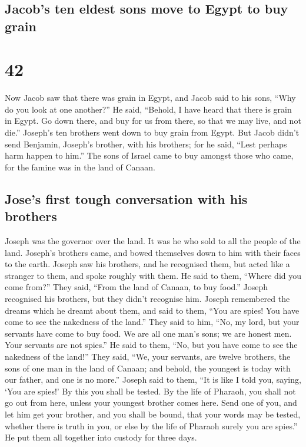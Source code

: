 \hypertarget{jacobs-ten-eldest-sons-move-to-egypt-to-buy-grain}{%
\subsection{Jacob's ten eldest sons move to Egypt to buy
grain}\label{jacobs-ten-eldest-sons-move-to-egypt-to-buy-grain}}

\hypertarget{section-41}{%
\section{42}\label{section-41}}

 Now Jacob saw that there was grain in Egypt, and Jacob
said to his sons, ``Why do you look at one another?''  He
said, ``Behold, I have heard that there is grain in Egypt. Go down
there, and buy for us from there, so that we may live, and not die.''
 Joseph's ten brothers went down to buy grain from Egypt.
 But Jacob didn't send Benjamin, Joseph's brother, with
his brothers; for he said, ``Lest perhaps harm happen to him.''
 The sons of Israel came to buy amongst those who came,
for the famine was in the land of Canaan.

\hypertarget{joses-first-tough-conversation-with-his-brothers}{%
\subsection{Jose's first tough conversation with his
brothers}\label{joses-first-tough-conversation-with-his-brothers}}

 Joseph was the governor over the land. It was he who sold
to all the people of the land. Joseph's brothers came, and bowed
themselves down to him with their faces to the earth. 
Joseph saw his brothers, and he recognised them, but acted like a
stranger to them, and spoke roughly with them. He said to them, ``Where
did you come from?'' They said, ``From the land of Canaan, to buy
food.''  Joseph recognised his brothers, but they didn't
recognise him.  Joseph remembered the dreams which he
dreamt about them, and said to them, ``You are spies! You have come to
see the nakedness of the land.''  They said to him, ``No,
my lord, but your servants have come to buy food.  We are
all one man's sons; we are honest men. Your servants are not spies.''
 He said to them, ``No, but you have come to see the
nakedness of the land!''  They said, ``We, your servants,
are twelve brothers, the sons of one man in the land of Canaan; and
behold, the youngest is today with our father, and one is no more.''
 Joseph said to them, ``It is like I told you, saying,
`You are spies!'  By this you shall be tested. By the
life of Pharaoh, you shall not go out from here, unless your youngest
brother comes here.  Send one of you, and let him get
your brother, and you shall be bound, that your words may be tested,
whether there is truth in you, or else by the life of Pharaoh surely you
are spies.''  He put them all together into custody for
three days.

